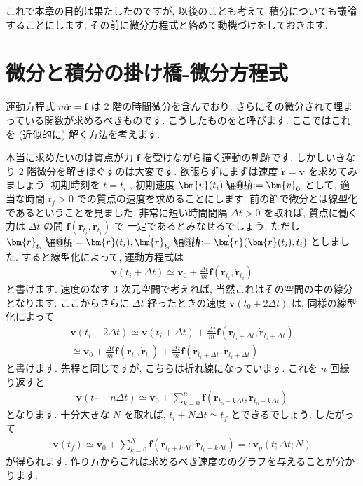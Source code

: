 \documentclass[openany, a4paper, oneside]{book}
\makeatletter
\newcommand*{\defeq}{\mathrel{\rlap{%
\raisebox{0.3ex}{$\m@th\cdot$}}%
\raisebox{-0.3ex}{$\m@th\cdot$}}%
=}
\theoremstyle{break}
\theoremstyle{breakdefn}
\newcommand{\deltat}{\varDelta t}
\makeatother
\begin{document}
これで本章の目的は果たしたのですが, 以後のことも考えて
積分についても議論することにします.
その前に微分方程式と絡めて動機づけをしておきます.
\section{微分と積分の掛け橋-微分方程式\label{sec:微分と積分の掛け橋}}
\label{sec-5-2-11}

運動方程式 $m \ddot{ \bm{r} } = \bm{f}$ は 2 階の時間微分を含んでおり,
さらにその微分されて埋まっている関数が求めるべきものです.
こうしたものをと呼びます.
ここではこれを (近似的に) 解く方法を考えます.

本当に求めたいのは質点が力 $\bm{f}$ を受けながら描く運動の軌跡です.
しかしいきなり 2 階微分を解きほぐすのは大変です.
欲張らずにまずは速度 $\dot{ \bm{r} } = \bm{v}$ を求めてみましょう.
初期時刻を $t = t_i$ , 初期速度 $\bm{v} ( t_i ) \defeq \bm{v}_0$ として,
適当な時間 $t_f>0$ での質点の速度を求めることにします.
前の節で微分とは線型化であるということを見ました.
非常に短い時間間隔 $\varDelta t >0$ を取れば, 質点に働く力は
$\deltat$ の間 $\bm{f} ( \bm{r}_{ t_i } , \dot{ \bm{r} }_{t_i} )$ で
一定であるとみなせるでしょう.
ただし $\bm{r}_{t_i} \defeq \bm{r} (t_i) , \dot{ \bm{r} }_{t_i} \defeq \dot{ \bm{r} } ( \bm{r} ( t_i ) , t_i )$
としました.
すると線型化によって, 運動方程式は
\begin{gather}
\bm{v} ( t_i + \deltat )
\simeq
\bm{v}_0 + \frac{\deltat} {m} \bm{f} ( \bm{r}_{ t_i } , \dot{ \bm{r} }_{t_i} )
\end{gather}
と書けます.
速度のなす 3 次元空間で考えれば, 当然これはその空間の中の線分となります.
ここからさらに $\deltat$ 経ったときの速度 $\bm{v} (t_0 + 2 \deltat)$ は,
同様の線型化によって
\begin{gather}
\bm{v} ( t_i + 2 \deltat )
\simeq
\bm{v} ( t_i + \deltat ) + \frac{\deltat} {m} \bm{f} ( \bm{r}_{ t_i + \deltat } , \dot{ \bm{r} }_{t_i + \deltat} )\\
\simeq
\bm{v}_0 + \frac{\deltat} {m} \bm{f} ( \bm{r}_{ t_i } , \dot{ \bm{r} }_{t_i} )
+\frac{\deltat} {m} \bm{f} ( \bm{r}_{ t_i + \deltat } , \dot{ \bm{r} }_{t_i + \deltat} )
\end{gather}
と書けます.
先程と同じですが, こちらは折れ線になっています.
これを $n$ 回繰り返すと
\begin{gather}
\bm{v} ( t_0 + n \deltat )
\simeq
\bm{v}_0 + \sum_{k=0}^n \bm{f} ( \bm{r}_{ t_0 + k \deltat } , \dot{ \bm{r} }_{t_0 + k \deltat} )
\end{gather}
となります.
十分大きな $N$ を取れば,  $t_i + N \deltat \simeq t_f$ とできるでしょう.
したがって
\begin{gather}
\bm{v} ( t_f )
\simeq
\bm{v}_0 + \sum_{k=0}^N \bm{f} ( \bm{r}_{ t_0 + k \deltat } , \dot{ \bm{r} }_{t_0 + k \deltat} )
=:
\bm{v}_p ( t ; \deltat ; N )
\end{gather}
が得られます.
作り方からこれは求めるべき速度ののグラフを与えることが分かります.
\end{document}
